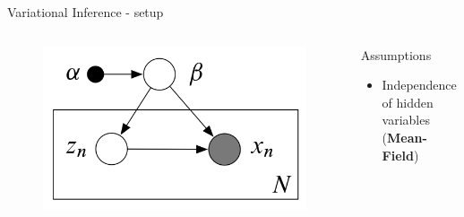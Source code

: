 \documentclass[aspectratio=169]{beamer}
\begin{document}
\begin{frame}{Variational Inference - setup}
    
    \begin{columns}
    \begin{column}{0.48\textwidth}
        \begin{figure}
        \includegraphics[width=\textwidth]{setup.png}\hspace*{12cm}
        \end{figure}
    \end{column}
    \begin{column}{0.48\textwidth}
        \begin{block}{Assumptions}
        \begin{itemize}
            \item Independence of hidden variables (\textbf{Mean-Field})
            
        \end{itemize}
        \end{block}
    \end{column}
    \end{columns}
\end{frame}
\end{document}
